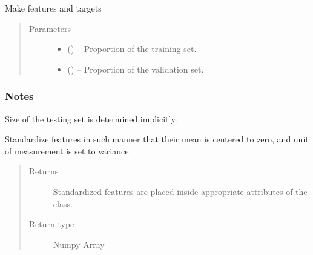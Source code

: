\documentclass[letterpaper,10pt,english]{sphinxmanual}
\begin{document}
\begin{fulllineitems}
\begin{fulllineitems}
\label{\detokenize{api/ucf.TrainingDataSets:ucf.TrainingDataSets.make_training_data}}
Make features and targets
\begin{quote}\begin{description}
\item[{Parameters}] \leavevmode\begin{itemize}
\item {} 
 () -- Proportion of the training set.

\item {} 
 () -- Proportion of the validation set.

\end{itemize}

\end{description}\end{quote}
\subsubsection*{Notes}

Size of the testing set is determined implicitly.

\end{fulllineitems}


\begin{fulllineitems}
\label{\detokenize{api/ucf.TrainingDataSets:ucf.TrainingDataSets.scale_features}}
Standardize features in such manner that their mean is centered
to zero, and unit of measurement is set to variance.
\begin{quote}\begin{description}
\item[{Returns}] \leavevmode
Standardized features are placed inside appropriate
attributes of the class.

\item[{Return type}] \leavevmode
Numpy Array

\end{description}\end{quote}


\end{fulllineitems}
\end{fulllineitems}
\end{document}
